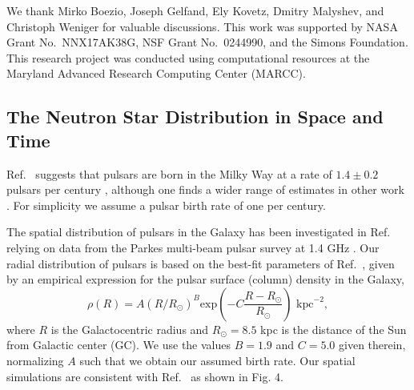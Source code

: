 \documentclass[aps,prd,twocolumn,amsmath,superscriptaddress,amssymb,showpacs,floatfix,nofootinbib]{revtex4-1}
\begin{document}
\bigskip                  
                  
We thank Mirko Boezio, Joseph Gelfand, Ely
Kovetz, Dmitry Malyshev, and Christoph Weniger for valuable
discussions.  This work was supported by NASA Grant
No.\ NNX17AK38G, NSF Grant No.\ 0244990, and the Simons
Foundation. This research project was conducted using 
computational resources  at the Maryland Advanced Research 
Computing Center (MARCC).




\begin{appendix}

\section{The Neutron Star Distribution in Space and Time}
\label{appA}

Ref.~\cite{Lorimer:2006qs} suggests that pulsars are born in the
Milky Way at a rate of $1.4 \pm 0.2$ pulsars per century
\cite{Lorimer:2006qs}, although one finds a wider range of
estimates in other work \cite{1999MNRAS.302..693D, Vranesevic:2003tp, FaucherGiguere:2005ny, Keane:2008jj}.
For simplicity we assume a pulsar birth rate of one per century. 

The spatial distribution of pulsars in the Galaxy has been
investigated in
Ref.~\cite{FaucherGiguere:2005ny,Lorimer:2003qc,Lorimer:2006qs}
relying on data from the Parkes multi-beam pulsar survey at 1.4
GHz \cite{Manchester:2001fp}.  Our radial distribution of
pulsars is based on the best-fit parameters of
Ref.~\cite{Lorimer:2006qs}, given by an empirical expression for
the pulsar surface (column) density in the Galaxy, 
	\begin{equation}
		\rho(R) = A (R/R_{\odot})^B \mbox{exp} \left( -C\frac{R-R_{\odot}}{R_{\odot}} \right) \mbox{ kpc}^{-2},
		\label{eq-lorimer}
	\end{equation}
where $R$ is the Galactocentric radius and $R_{\odot} = 8.5$ kpc is the distance of the Sun from Galactic center (GC). We use the values $B = 1.9$ and $C=5.0$ given therein, normalizing $A$ such that we obtain our
assumed birth rate.
Our spatial simulations are consistent with
Ref.~\cite{Lorimer:2003qc} as shown in
Fig. 4. %


\end{appendix}
\end{document}
